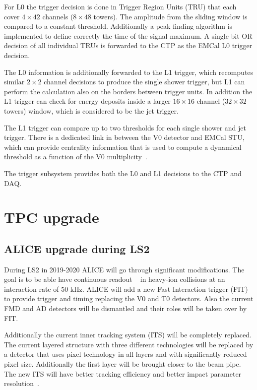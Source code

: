 For L0 the trigger decision is done in Trigger Region Units (TRU) that each cover $4\times42$ channels ($8\times48$ towers). The amplitude from the sliding window is compared to a constant threshold. Additionally a peak finding algorithm is implemented to define correctly the time of the signal maximum. A single bit OR decision of all individual TRUs is forwarded to the CTP as the EMCal L0 trigger decision.

The L0 information is additionally forwarded to the L1 trigger, which recomputes similar $2\times2$ channel decisions to produce the single shower trigger, but L1 can perform the calculation also on the borders between trigger units. In addition the L1 trigger can  check for energy deposits inside a larger $16\times16$ channel ($32\times32$ towers) window, which is considered to be the jet trigger.

The L1 trigger can compare up to two thresholds for each single shower and jet trigger. There is a dedicated link in between the V0 detector and EMCal STU, which can provide centrality information that is used to compute a dynamical threshold as a function of the V0 multiplicity~\cite{KRAL2012261}.

The trigger subsystem provides both the L0 and L1 decisions to the CTP and DAQ. 


\section{TPC upgrade}
\label{sec:tpcupgrade}
\subsection{ALICE upgrade during LS2}
During LS2 in 2019-2020 ALICE will go through significant modifications. The goal is to be able have continuous readout ~\cite{aliceupgrade} in heavy-ion collisions at an interaction rate of 50 kHz.  ALICE will add a new Fast Interaction trigger (FIT)~\cite{Maevskaya:2019bba} to provide trigger and timing replacing the V0 and T0 detectors. Also the current FMD and AD detectors will be dismantled and their roles will be taken over by FIT.

Additionally the current inner tracking system (ITS) will be completely replaced. The current layered structure with three different technologies will be replaced by a detector that uses pixel technology in all layers and with significantly reduced pixel size. Additionally the first layer will be brought closer to the beam pipe. The new ITS will have better tracking efficiency and better impact parameter resolution~\cite{ITSupgrade}. 


